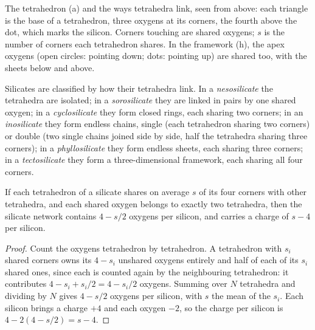 \begin{omfigure}
{\small The  tetrahedron (a) and the ways tetrahedra link, seen from
above: each triangle is the base of a tetrahedron, three oxygens at its
corners, the fourth above the dot, which marks the silicon. Corners touching
are shared oxygens; $s$ is the number of corners each tetrahedron shares. In
the framework (h), the apex oxygens (open circles: pointing down; dots:
pointing up) are shared too, with the sheets below and above.}
\end{omfigure}

\begin{definition}\label{def:b1:rock-forming-minerals:silicate-classes}
Silicates are classified by how their  tetrahedra link. In a
\emph{nesosilicate} the tetrahedra are isolated; in a
\emph{sorosilicate} they are linked in pairs by one
shared oxygen; in a \emph{cyclosilicate} they form closed
rings, each sharing two corners; in an \emph{inosilicate}
they form endless chains, single (each tetrahedron sharing two corners) or
double (two single chains joined side by side, half the tetrahedra sharing
three corners); in a \emph{phyllosilicate} they form
endless sheets, each sharing three corners; in a
\emph{tectosilicate} they form a three-dimensional
framework, each sharing all four corners.
\end{definition}

\begin{proposition}\label{prop:b1:rock-forming-minerals:si-o}
If each  tetrahedron of a silicate shares on average $s$ of its four
corners with other tetrahedra, and each shared oxygen belongs to exactly two
tetrahedra, then the silicate network contains $4 - s/2$ oxygens per silicon,
and carries a charge of $s - 4$ per silicon.
\end{proposition}

\begin{proof}
Count the oxygens tetrahedron by tetrahedron. A tetrahedron with $s_i$ shared
corners owns its $4 - s_i$ unshared oxygens entirely and half of each of its
$s_i$ shared ones, since each is counted again by the neighbouring
tetrahedron: it contributes $4 - s_i + s_i/2 = 4 - s_i/2$ oxygens. Summing
over $N$ tetrahedra and dividing by $N$ gives $4 - s/2$ oxygens per silicon,
with $s$ the mean of the $s_i$. Each silicon brings a charge $+4$ and each
oxygen $-2$, so the charge per silicon is $4 - 2(4 - s/2) = s - 4$.
\end{proof}

